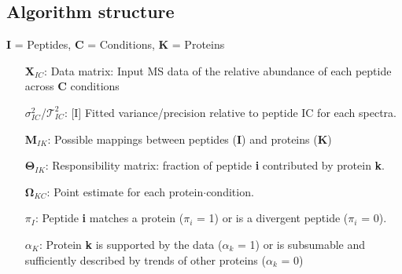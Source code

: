 \subsection*{Algorithm structure}

\textbf{I} = Peptides, \textbf{C} = Conditions, \textbf{K} = Proteins

\begin{itemize}
\item[\textbf{X}$_{IC}$:] Data matrix: Input MS data of the relative abundance of each peptide across \textbf{C} conditions
\item[$\sigma^{2}_{IC}$/$\mathcal{T}^{2}_{IC}$:] [I] Fitted variance/precision relative to peptide IC for each spectra.
\item[\textbf{M}$_{IK}$:] Possible mappings between peptides (\textbf{I}) and proteins (\textbf{K})
\item[$\mathbf{\Theta}_{IK}$:] Responsibility matrix: fraction of peptide \textbf{i} contributed by protein \textbf{k}.
\item[$\mathbf{\Omega}_{KC}$:] Point estimate for each protein$\cdot$condition.
\item[$\pi_{I}$:] Peptide \textbf{i} matches a protein ($\pi_{i}$ = 1) or is a divergent peptide ($\pi_{i}$ = 0).
\item[$\alpha_{K}$:] Protein \textbf{k} is supported by the data ($\alpha_k$ = 1) or is subsumable and sufficiently described by trends of other proteins ($\alpha_{k}$ = 0)
\end{itemize}

